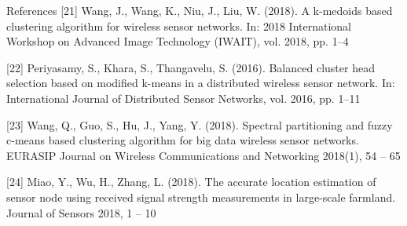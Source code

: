 \documentclass{beamer}
\begin{document}
\begin{frame}[t]{References}
\tiny
[21] Wang, J., Wang, K., Niu, J., Liu, W. (2018). A k-medoids based clustering algorithm for wireless sensor networks. In: 2018 International Workshop on Advanced Image Technology (IWAIT), vol. 2018, pp. 1–4

[22] Periyasamy, S., Khara, S., Thangavelu, S. (2016). Balanced cluster head selection based on modified k-means in a distributed wireless sensor network. In: International Journal of Distributed Sensor Networks, vol. 2016, pp. 1–11

[23] Wang, Q., Guo, S., Hu, J., Yang, Y. (2018). Spectral partitioning and fuzzy c-means based clustering algorithm for big data wireless sensor networks. EURASIP Journal on Wireless Communications and Networking 2018(1), 54 – 65

[24] Miao, Y., Wu, H., Zhang, L. (2018). The accurate location estimation of sensor node using received signal strength measurements in large-scale farmland. Journal of Sensors 2018, 1 – 10

\end{frame}
\end{document}
